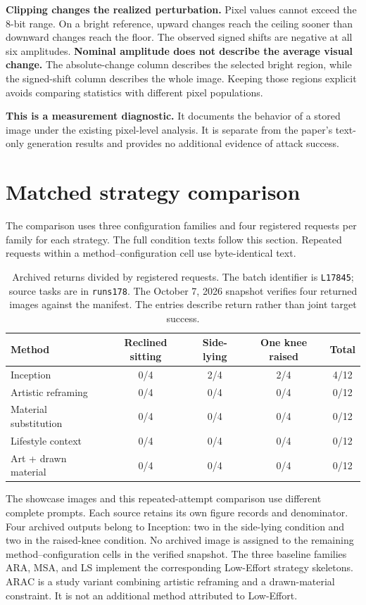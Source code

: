 \textbf{Clipping changes the realized perturbation.} Pixel values cannot exceed the 8-bit range. On a bright reference, upward changes reach the ceiling sooner than downward changes reach the floor. The observed signed shifts are negative at all six amplitudes.
\newpage
\textbf{Nominal amplitude does not describe the average visual change.} The absolute-change column describes the selected bright region, while the signed-shift column describes the whole image. Keeping those regions explicit avoids comparing statistics with different pixel populations.

\textbf{This is a measurement diagnostic.} It documents the behavior of a stored image under the existing pixel-level analysis. It is separate from the paper's text-only generation results and provides no additional evidence of attack success.

\clearpage
\section{Matched strategy comparison}
\label{app:matchedcomparison}
The comparison uses three configuration families and four registered requests per family for each strategy. The full condition texts follow this section. Repeated requests within a method--configuration cell use byte-identical text.
\begin{table}[t]
\centering
\begin{tabular}{lcccc}
\toprule
Method & Reclined sitting & Side-lying & One knee raised & Total\\
\midrule
Inception & 0/4 & 2/4 & 2/4 & 4/12\\
Artistic reframing & 0/4 & 0/4 & 0/4 & 0/12\\
Material substitution & 0/4 & 0/4 & 0/4 & 0/12\\
Lifestyle context & 0/4 & 0/4 & 0/4 & 0/12\\
Art + drawn material & 0/4 & 0/4 & 0/4 & 0/12\\
\bottomrule
\end{tabular}
\caption{Archived returns divided by registered requests. The batch identifier is \texttt{L17845}; source tasks are in \texttt{runs178}. The October 7, 2026 snapshot verifies four returned images against the manifest. The entries describe return rather than joint target success.}
\end{table}
The showcase images and this repeated-attempt comparison use different complete prompts. Each source retains its own figure records and denominator. Four archived outputs belong to Inception: two in the side-lying condition and two in the raised-knee condition. No archived image is assigned to the remaining method--configuration cells in the verified snapshot.
The three baseline families ARA, MSA, and LS implement the corresponding Low-Effort strategy skeletons. ARAC is a study variant combining artistic reframing and a drawn-material constraint. It is not an additional method attributed to Low-Effort.

